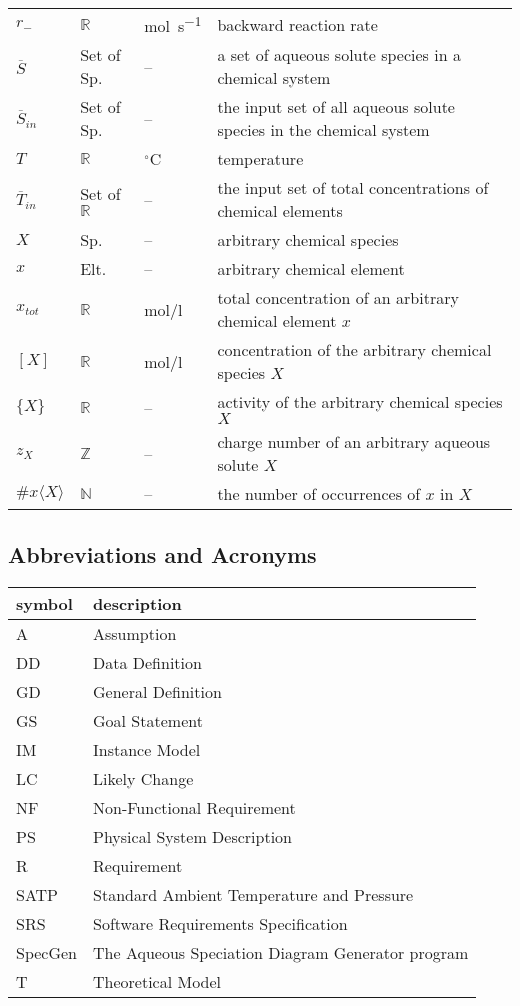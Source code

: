 \documentclass[12pt]{article}
\newcommand{\progname}{SpecGen} %
\begin{document}
\begin{longtable*}{l l l p{8cm}}
$r_-$ & $\mathbb{R}$ & \si{\mole\per\second} & backward reaction rate
\\
$\overline S$ & Set of Sp.  & -- & a set of aqueous solute species in a chemical system
\\ 
$\overline S_{in}$ & Set of Sp. & -- & the input set of all aqueous solute species in 
  the chemical system
\\ 
$T$ & $\mathbb{R}$ & $^{\circ}$C & temperature
\\
$\overline T_{in}$ & Set of $\mathbb{R}$ & -- & the input set of total concentrations of chemical 
  elements
\\ 
$X$ & Sp. & -- & arbitrary chemical species
\\
$x$ & Elt. & -- & arbitrary chemical element
\\
$x_{tot}$ & $\mathbb{R}$ & \si[per-mode=symbol] {\mole\per\litre} & total concentration of an 
  arbitrary chemical element $x$
\\
$[X]$ & $\mathbb{R}$ & \si[per-mode=symbol] {\mole\per\litre} & concentration of the arbitrary 
  chemical species $X$
\\
$\{X\}$ & $\mathbb{R}$ & -- & activity of the arbitrary chemical species $X$
\\
$z_{X}$ & $\mathbb{Z}$ & -- & charge number of an arbitrary aqueous solute $X$
\\
$\#x\langle X\rangle$ & $\mathbb{N}$ & -- & the number of occurrences of $x$ in $X$
\\
\bottomrule
\end{longtable*}


\subsection{Abbreviations and Acronyms}

\renewcommand{\arraystretch}{1.2}
\begin{tabular}{l l} 
  \toprule		
  \textbf{symbol} & \textbf{description}\\
  \midrule 
  A & Assumption\\
  DD & Data Definition\\
  GD & General Definition\\
  GS & Goal Statement\\
  IM & Instance Model\\
  LC & Likely Change\\
  NF & Non-Functional Requirement\\
  PS & Physical System Description\\
  R & Requirement\\
  SATP & Standard Ambient Temperature and Pressure\\
  SRS & Software Requirements Specification\\
  \progname{} & The Aqueous Speciation Diagram Generator program\\
  T & Theoretical Model\\
  \bottomrule
\end{tabular}\\
\end{document}
